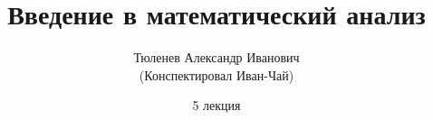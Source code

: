 \documentclass[a5paper, 10pt]{article}
\theoremstyle{plain}
\begin{document}
	\author{Тюленев Александр Иванович\\(Конспектировал Иван-Чай)}
	\date{5 лекция}
	\title{Введение в математический анализ}

	\linespread{1.4}
	\selectfont

	\maketitle
	\newpage

	\tableofcontents
\end{document}
